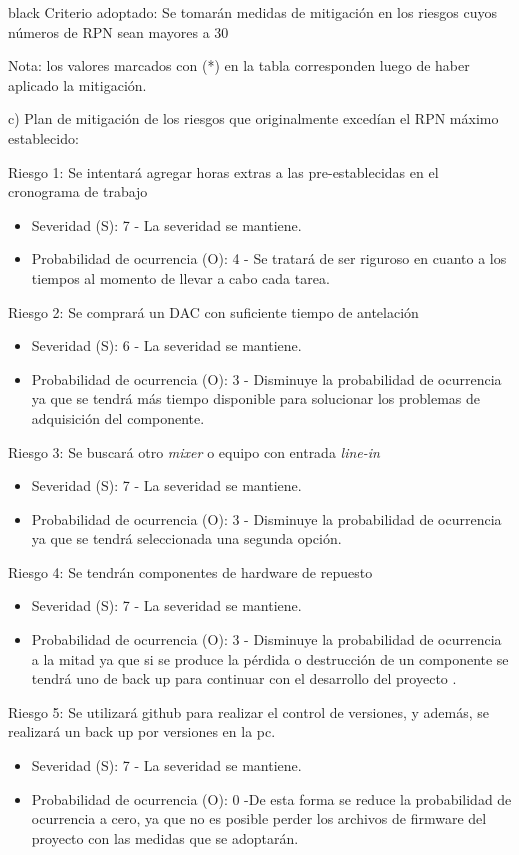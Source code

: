 \documentclass[11pt]{charter}
\begin{document}
\begin{consigna}{black}
Criterio adoptado: 
Se tomarán medidas de mitigación en los riesgos cuyos números de RPN sean mayores a 30

Nota: los valores marcados con (*) en la tabla corresponden luego de haber aplicado la mitigación.

c) Plan de mitigación de los riesgos que originalmente excedían el RPN máximo establecido:
 
Riesgo 1: Se intentará agregar horas extras a las pre-establecidas en el cronograma de trabajo
\begin{itemize}
\item Severidad (S): 7 - La severidad se mantiene.
\item Probabilidad de ocurrencia (O): 4 - Se tratará de ser riguroso en cuanto a los tiempos al momento de llevar a cabo cada tarea.
\end{itemize}

Riesgo 2: Se comprará un DAC con suficiente tiempo de antelación
\begin{itemize}
\item Severidad (S): 6 - La severidad se mantiene.
\item Probabilidad de ocurrencia (O): 3 - Disminuye la probabilidad de ocurrencia ya que se tendrá más tiempo disponible para solucionar los problemas de adquisición del componente.
\end{itemize}

Riesgo 3: Se buscará otro \textit{mixer} o equipo con entrada \textit{line-in}
\begin{itemize}
\item Severidad (S): 7 - La severidad se mantiene.
\item Probabilidad de ocurrencia (O): 3 - Disminuye la probabilidad de ocurrencia ya que se tendrá seleccionada una segunda opción.  
\end{itemize}

Riesgo 4: Se tendrán componentes de hardware de repuesto
\begin{itemize}
\item Severidad (S): 7 - La severidad se mantiene.
\item Probabilidad de ocurrencia (O): 3 - Disminuye la probabilidad de ocurrencia a la mitad ya que si se produce la pérdida o destrucción de un componente se tendrá uno de back up para continuar con el desarrollo del proyecto .
\end{itemize}

Riesgo 5: Se utilizará github para realizar el control de versiones, y además, se realizará un back up por versiones en la pc.
\begin{itemize}
\item Severidad (S): 7 - La severidad se mantiene.
\item Probabilidad de ocurrencia (O): 0 -De esta forma se reduce la probabilidad de ocurrencia a cero, ya que no es posible perder los archivos de firmware del proyecto con las medidas que se adoptarán.
\end{itemize}


\end{consigna}
\end{document}
